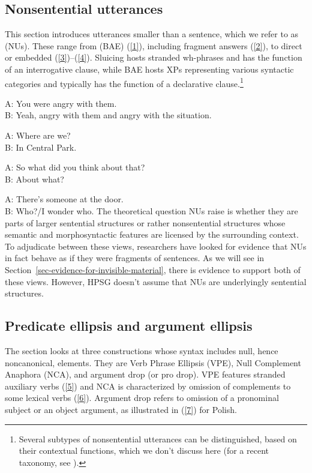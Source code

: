 \documentclass[output=paper
                ,modfonts
                ,nonflat
	        ,collection
	        ,collectionchapter
	        ,collectiontoclongg
 	        ,biblatex
                ,babelshorthands
                ,newtxmath
                ,draftmode
                ,colorlinks, citecolor=brown
]{./langsci/langscibook}
\begin{document}
{\subsection{Nonsentential utterances}
This section introduces utterances smaller than a sentence, which we refer to as \emph{} (NUs). These range from \emph{} (BAE) (\ref{1}), including fragment answers (\ref{2}), to direct or embedded  (\ref{3})--(\ref{4}). Sluicing hosts stranded wh-phrases and has the function of an interrogative clause, while BAE hosts XPs representing various syntactic categories and typically has the function of a declarative clause.\footnote{Several subtypes of nonsentential utterances can be distinguished, based on their contextual functions, which we don't discuss here (for a recent taxonomy, see \citealt{Ginzburg2012}).}



\ea A: You were angry with them.\\ B: Yeah, angry with them and angry with the situation.\label{1}\z

\ea A: Where are we? \\B: In Central Park.\label{2}\z

\ea A: So what did you think about that?\\ B: About what? \label{3}\z

\ea A: There's someone at the door. \\B: Who?/I wonder who. \label{4}\z
The theoretical question NUs raise is whether they are parts of larger sentential structures or rather nonsentential structures whose semantic and morphosyntactic features are licensed by the surrounding context. To adjudicate between these views, researchers have looked for evidence that NUs in fact behave as if they were fragments of sentences. As we will see in Section~\ref{sec-evidence-for-invisible-material}, there is evidence to support both of these views. However, HPSG doesn't assume that NUs are underlyingly sentential structures.

\subsection{Predicate ellipsis and argument ellipsis}
The section looks at three constructions whose syntax includes null, hence noncanonical, elements. They are Verb Phrase Ellipsis (VPE), Null Complement Anaphora (NCA), and argument drop (or pro drop). VPE features stranded auxiliary verbs (\ref{5}) and NCA is characterized by omission of complements to some lexical verbs (\ref{6}). Argument drop refers to omission of a pronominal subject or an object argument, as illustrated in (\ref{7}) for Polish.

}
\end{document}

